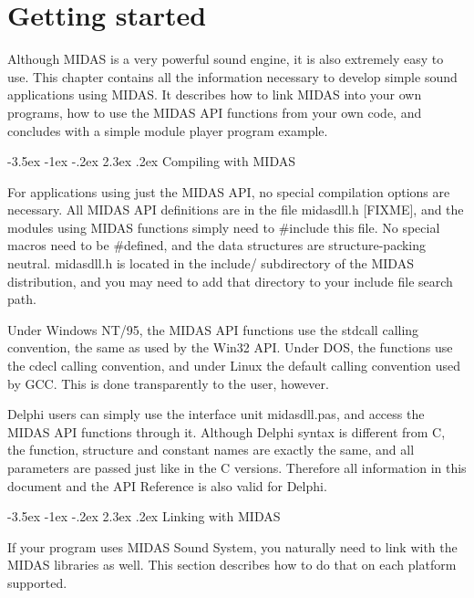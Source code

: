 \documentclass[a4paper,12pt,oneside]{book}
\makeatletter
\renewcommand\section{\@startsection {section}{1}{-20pt}%
                                   {-3.5ex \@plus -1ex \@minus -.2ex}%
                                   {2.3ex \@plus.2ex}%
                                   {\normalfont\Large\bfseries}}
\newcommand{\mResWord}[1]{{\ttfamily #1}}
\newcommand{\mFileName}[1]{{\ttfamily #1}}
\makeatother
\begin{document}
\chapter{Getting started}

Although MIDAS is a very powerful sound engine, it is also extremely
easy to use. This chapter contains all the information necessary to develop
simple sound applications using MIDAS. It describes how to link MIDAS into
your own programs, how to use the MIDAS API functions from your own code, and
concludes with a simple module player program example.


\section{Compiling with MIDAS}

For applications using just the MIDAS API, no special compilation options are
necessary. All MIDAS API definitions are in the file \mFileName{midasdll.h}
[FIXME], and the modules using MIDAS functions simply need to
\mResWord{\#{}include} this file. No special macros need to be
\mResWord{\#{}define}d, and the data structures are structure-packing neutral.
\mFileName{midasdll.h} is located in the \mFileName{include/} subdirectory of
the MIDAS distribution, and you may need to add that directory to your
include file search path.

Under Windows NT/95, the MIDAS API functions use the \mResWord{stdcall}
calling convention, the same as used by the Win32 API. Under DOS, the
functions use the \mResWord{cdecl} calling convention, and under Linux the
default calling convention used by GCC. This is done transparently to the
user, however.

Delphi users can simply use the interface unit \mFileName{midasdll.pas}, and
access the MIDAS API functions through it. Although Delphi syntax is
different from C, the function, structure and constant names are exactly the
same, and all parameters are passed just like in the C versions. Therefore
all information in this document and the API Reference is also valid for
Delphi.



\section{Linking with MIDAS}

If your program uses MIDAS Sound System, you naturally need to link with the
MIDAS libraries as well. This section describes how to do that on each
platform supported.
\end{document}
